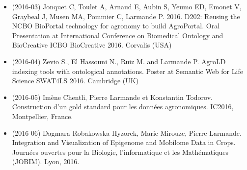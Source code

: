 \begin{itemize}
\item (2016-03) Jonquet C, Toulet A, Arnaud E, Aubin S, Yeumo ED, Emonet V, Graybeal J, Musen MA, Pommier C, Larmande P.  2016.  D202: Reusing the NCBO BioPortal technology for agronomy to build AgroPortal. Oral Presentation at International Conference on Biomedical Ontology and BioCreative ICBO BioCreative 2016. Corvalis (USA)
\item (2016-04) Zevio S., El Hassouni N., Ruiz M. and Larmande P. AgroLD indexing tools with ontological annotations. Poster at Semantic Web for Life Science SWAT4LS 2016. Cambridge (UK)
\item (2016-05) Imène Chentli, Pierre Larmande et Konstantin Todorov. Construction d’un gold standard pour les données agronomiques. IC2016, Montpellier, France.
\item (2016-06) Dagmara Robakowska Hyzorek, Marie Mirouze, Pierre Larmande. Integration and Visualization of Epigenome and Mobilome Data in Crops. Journées ouvertes pour la Biologie, l’informatique et les Mathématiques (JOBIM). Lyon, 2016.
\end{itemize}


